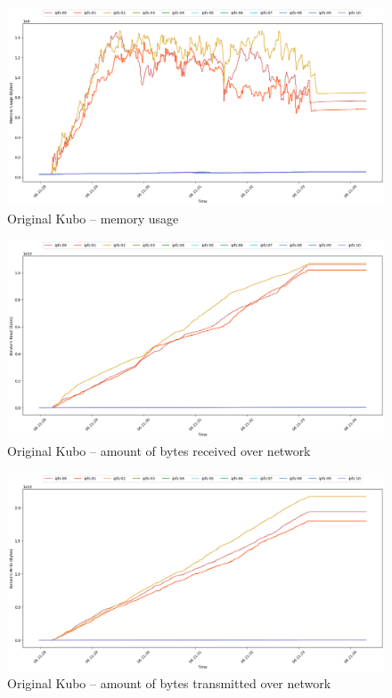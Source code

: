\begin{figure}[H]
\includegraphics[width=\linewidth]{figures/original/mem_usage.png}
\caption{Original Kubo -- memory usage}
\end{figure}
\begin{figure}[H]
\includegraphics[width=\linewidth]{figures/original/net_read.png}
\caption{Original Kubo -- amount of bytes received over network}
\end{figure}
\begin{figure}[H]
\includegraphics[width=\linewidth]{figures/original/net_write.png}
\caption{Original Kubo -- amount of bytes transmitted over network}
\end{figure}


